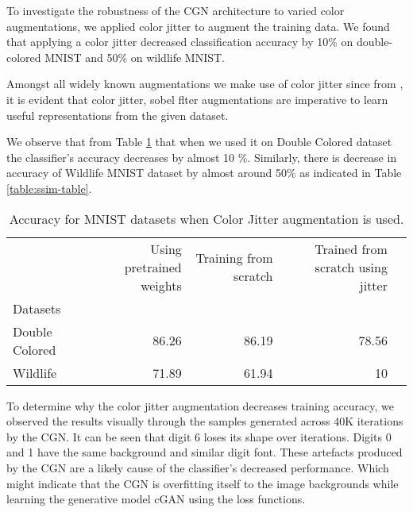 To investigate the robustness of the CGN architecture \cite{sauer2021counterfactual} to varied color augmentations, we applied color jitter to augment the training data. We found that applying a color jitter decreased classification accuracy by 10\% on double-colored MNIST and 50\% on wildlife MNIST.


Amongst all widely known augmentations we make use of color jitter since from \cite{chen2020simple}, \cite{he2020momentum} it is evident that color jitter, sobel flter augmentations are imperative to learn useful representations from the given dataset. 

We observe that from Table \ref{table:colorjitter-table} that when we used it on Double Colored dataset the classifier's accuracy decreases by almost 10 \%. Similarly, there is decrease in accuracy of Wildlife MNIST dataset by almost around 50\% as indicated in Table \ref{table:ssim-table}. 


\begin{table}[h]
\centering
\tiny
\begin{tabular}{lrrrr}
\toprule
{} & Using pretrained weights &  Training from scratch & Trained from scratch using jitter\\
Datasets  &              &              &                            \\
\midrule
Double Colored              &        86.26  &        86.19 &         78.56  \\
Wildlife              &        71.89 &        61.94 &         10  \\
\bottomrule
\end{tabular}
\caption{Accuracy for MNIST datasets when Color Jitter augmentation is used.   }
\label{table:colorjitter-table}
\end{table}


To determine why the color jitter augmentation decreases training accuracy, we observed the results visually through the samples generated across 40K iterations by the CGN. 
It can be seen that digit 6 loses its shape over iterations. Digits 0 and 1 have the same background and similar digit font. These artefacts produced by the CGN\cite{sauer2021counterfactual} are a likely cause of the classifier's decreased performance. Which might indicate that the CGN is overfitting itself to the image backgrounds while learning the generative model cGAN using the loss functions. 

